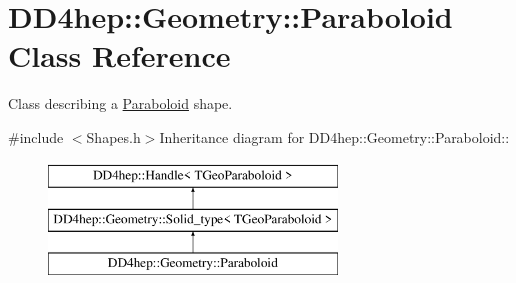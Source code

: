 \hypertarget{class_d_d4hep_1_1_geometry_1_1_paraboloid}{
\section{DD4hep::Geometry::Paraboloid Class Reference}
\label{class_d_d4hep_1_1_geometry_1_1_paraboloid}
}


Class describing a \hyperlink{class_d_d4hep_1_1_geometry_1_1_paraboloid}{Paraboloid} shape.  


{\ttfamily \#include $<$Shapes.h$>$}Inheritance diagram for DD4hep::Geometry::Paraboloid::\begin{figure}[H]
\begin{center}
\leavevmode
\includegraphics[height=3cm]{class_d_d4hep_1_1_geometry_1_1_paraboloid}
\end{center}
\end{figure}
